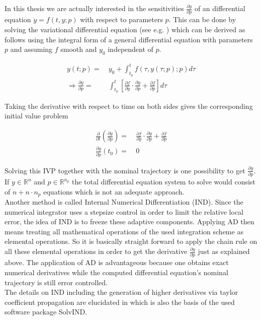 \documentclass{scrartcl}[12pt, halfparskip]
\numberwithin{equation}{section}
\numberwithin{figure}{section}
\numberwithin{table}{section}
\begin{document}
In this thesis we are actually interested in the sensitivities $\frac{\partial y}{\partial p}$ of an differential equation $\dot{y}=f(t,y;p)$ with respect to parameters $p$. This can be done by solving the variational differential equation (see e.g. \cite{diff_equations_numerics}) which can be derived as follows using the integral form of a general differential equation with parameters $p$ and assuming $f$ smooth and $y_0$ independent of $p$.

\begin{align}
	y(t;p) = \ & y_0 + \int_{t_0}^{t} f(\tau,y(\tau;p);p) d\tau \\
	\Rightarrow \frac{\partial y}{\partial p} = & \int_{t_0}^{t} \left[ \frac{\partial f}{\partial y} \cdot \frac{\partial y}{\partial p} + \frac{\partial f}{\partial p} \right] d\tau \nonumber
\end{align}

Taking the derivative with respect to time on both sides gives the corresponding initial value problem

\begin{align}
	\frac{\partial}{\partial t} \left( \frac{\partial y}{\partial p} \right) = \ & \frac{\partial f}{\partial y} \cdot \frac{\partial y}{\partial p} + \frac{\partial f}{\partial p} \\
	\frac{\partial y}{\partial p}(t_0) = \ & 0 \nonumber
\end{align}

Solving this IVP together with the nominal trajectory is one possibility to get $\frac{\partial y}{\partial p}$. If $y \in \mathbb{R}^n$ and $p \in \mathbb{R}^{n_p}$ the total differential equation system to solve would consist of $n + n \cdot n_p$ equations which is not an adequate approach. \\
Another method is called Internal Numerical Differentiation (IND). Since the numerical integrator uses a stepsize control in order to limit the relative local error, the idea of IND is to freeze these adaptive components. 
Applying AD then means treating all mathematical operations of the used integration scheme as elemental operations. So it is basically straight forward to apply the chain rule on all these elemental operations in order to get the derivative $\frac{\partial y}{\partial p}$ just as explained above. 
The application of AD is advantageous because one obtains exact numerical derivatives while the computed differential equation's nominal trajectory is still error controlled. \\
The details on IND including the generation of higher derivatives via taylor coefficient propagation are elucidated in \cite{diss_jan} which is also the basis of the used software package SolvIND.
\end{document}
